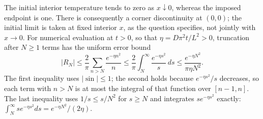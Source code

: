 The initial interior temperature tends to zero as $x\downarrow0$,
whereas the imposed endpoint is one.  There is consequently a corner
discontinuity at $(0,0)$; the initial limit is taken at fixed interior
$x$, as the question specifies, not jointly with $x\to0$.
For numerical evaluation at $t>0$, so that $\eta=D\pi^2t/L^2>0$,
truncation after $N\ge1$ terms has the uniform error bound
\[
|R_N|\le\frac2\pi\sum_{n>N}\frac{e^{-\eta n^2}}n
\le\frac2\pi\int_N^\infty\frac{e^{-\eta s^2}}s\,ds
\le\frac{e^{-\eta N^2}}{\pi\eta N^2}.
\]
The first inequality uses $|\sin|\le1$; the second holds because
$e^{-\eta s^2}/s$ decreases, so each term with $n>N$ is at most the
integral of that function over $[n-1,n]$.  The last inequality uses
$1/s\le s/N^2$ for $s\ge N$ and integrates $s e^{-\eta s^2}$ exactly:
$\int_N^\infty se^{-\eta s^2}ds=e^{-\eta N^2}/(2\eta)$.

